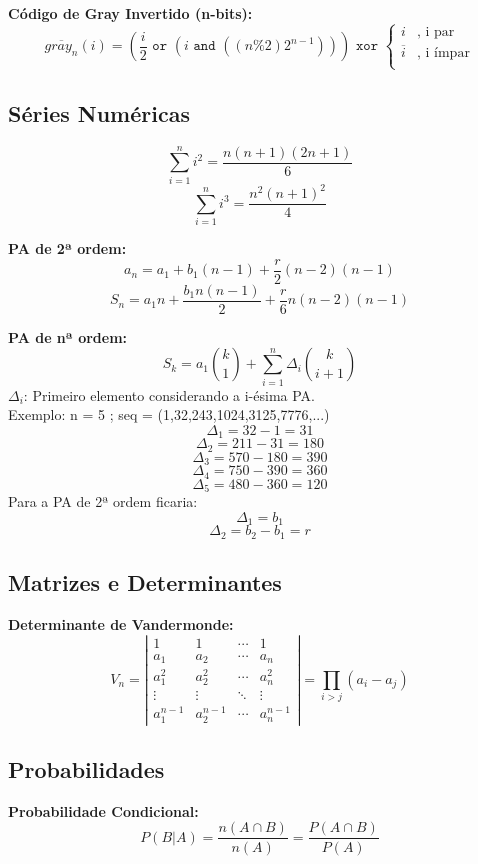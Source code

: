   {\bf Código de Gray Invertido (n-bits):}
  $$
  \overline{gray_n}(i) =
  (\frac{i}{2} \texttt{ or } (i \texttt{ and } ((n\%2)2^{n-1})))
   \texttt{ xor } \left\{
  \begin{array}{ll}
    i         &\textrm{, i par} \\
    \overline{i}        &\textrm{, i ímpar} \\
  \end{array} \right.
  $$

  \subsection{Séries Numéricas}
  $$\sum_{i=1}^{n} i^{2} = \frac{n(n+1)(2n+1)}{6}$$
  $$\sum_{i=1}^{n} i^{3} = \frac{n^{2}(n+1)^{2}}{4}$$
  
  {\bf PA de 2ª ordem:} 
  $$a_{n} = a_{1} + b_{1}(n-1) + \frac{r}{2}(n-2)(n-1)$$
  $$S_{n} = a_{1}n + \frac{b_{1}n(n-1)}{2} + \frac{r}{6}n(n-2)(n-1)$$

  {\bf PA de nª ordem:}   
  $$S_{k} = a_{1}{k \choose 1} + \sum_{i=1}^{n}\Delta_{i}{k \choose i + 1}$$
  $\Delta_{i}$: Primeiro elemento considerando a i-ésima PA.
  \\
  Exemplo: n = 5 ; seq = (1,32,243,1024,3125,7776,...)
  \\
  $$\Delta_{1} = 32 - 1 = 31$$
  $$\Delta_{2} = 211 - 31 = 180$$
  $$\Delta_{3} = 570 - 180 = 390$$
  $$\Delta_{4} = 750 - 390 = 360$$
  $$\Delta_{5} = 480 - 360 = 120$$		
  Para a PA de 2ª ordem ficaria:
  $$\Delta_{1} = b_{1}$$
  $$\Delta_{2} = b_{2} - b_{1} = r$$  

  \subsection{Matrizes e Determinantes}
  {\bf Determinante de Vandermonde:}
  $$
  V_{n} = \left|
  \begin{array}{cccc}
    1     & 1     & \cdots & 1 \\
    a_{1} & a_{2} & \cdots & a_{n} \\
    a_{1}^{2} & a_{2}^{2} & \cdots & a_{n}^{2} \\
    \vdots & \vdots & \ddots & \vdots \\
    a_{1}^{n-1} & a_{2}^{n-1} & \cdots & a_{n}^{n-1}
  \end{array} \right| = \prod_{i>j} (a_{i}-a_{j})
  $$
  \subsection{Probabilidades}
  {\bf Probabilidade Condicional:}
  $$
  P(B|A) = \frac{ n(A \cap B) }{ n(A) } = \frac{ P(A \cap B) }{ P(A) }
  $$

